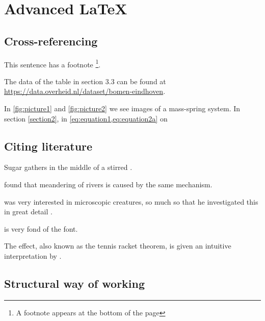 \chapter{Advanced \LaTeX}
\section{Cross-referencing}

This sentence has a footnote \footnote{A footnote appears at the bottom of the page}.

The data of the table in section 3.3 can be found at \url{https://data.overheid.nl/dataset/bomen-eindhoven}.

    In \cref{fig:picture1} and \cref{fig:picture2} we see images of a mass-spring system. In section \cref{section2}, in \cref{eq:equation1,eq:equation2a} on 


\section{Citing literature}
Sugar gathers in the middle of a stirred \cite{Naujoks2017}.

\textcite{Calvert2020} found that meandering of rivers is caused by the same mechanism.

\textcite{David2019} was very interested in microscopic creatures, so much so that he investigated this in great detail \cite{Bender2014}.

\textcite{Brinkley2019} is very fond of the \citeauthor{Leighton1993-hv} font.

The \textcite{Pearson1905-du} effect, also known as the tennis racket theorem, is given an intuitive interpretation by \textcite{Na2015}.


\section{Structural way of working}